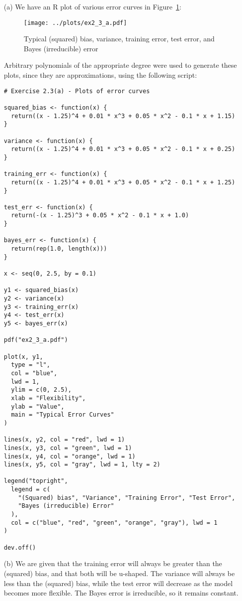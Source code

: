 
\begin{itemize}
    \item[(a)] We have an R plot of various error curves in Figure~\ref{fig2_3err}:
    \begin{figure}[!ht]
        \texttt{[image: ../plots/ex2\_3\_a.pdf]}
        \caption{
            Typical (squared) bias, variance, training error, test error, and Bayes 
            (irreducible) error \label{fig2_3err}
        }
    \end{figure}
    Arbitrary polynomials of the appropriate degree were used to generate these 
    plots, since they are approximations, using the following script:
    \scriptsize\begin{verbatim}
# Exercise 2.3(a) - Plots of error curves

squared_bias <- function(x) {
  return((x - 1.25)^4 + 0.01 * x^3 + 0.05 * x^2 - 0.1 * x + 1.15)
}

variance <- function(x) {
  return((x - 1.25)^4 + 0.01 * x^3 + 0.05 * x^2 - 0.1 * x + 0.25)
}

training_err <- function(x) {
  return((x - 1.25)^4 + 0.01 * x^3 + 0.05 * x^2 - 0.1 * x + 1.25)
}

test_err <- function(x) {
  return(-(x - 1.25)^3 + 0.05 * x^2 - 0.1 * x + 1.0)
}

bayes_err <- function(x) {
  return(rep(1.0, length(x)))
}

x <- seq(0, 2.5, by = 0.1)

y1 <- squared_bias(x)
y2 <- variance(x)
y3 <- training_err(x)
y4 <- test_err(x)
y5 <- bayes_err(x)

pdf("ex2_3_a.pdf")

plot(x, y1,
  type = "l", 
  col = "blue", 
  lwd = 1, 
  ylim = c(0, 2.5), 
  xlab = "Flexibility",
  ylab = "Value", 
  main = "Typical Error Curves"
)

lines(x, y2, col = "red", lwd = 1)
lines(x, y3, col = "green", lwd = 1)
lines(x, y4, col = "orange", lwd = 1)
lines(x, y5, col = "gray", lwd = 1, lty = 2)

legend("topright",
  legend = c(
    "(Squared) bias", "Variance", "Training Error", "Test Error",
    "Bayes (irreducible) Error"
  ),
  col = c("blue", "red", "green", "orange", "gray"), lwd = 1
)

dev.off()

    \end{verbatim}\normalsize
  \item[(b)] We are given that the training error will always be greater than
  the (squared) bias, and that both will be u-shaped. The variance will always
  be less than the (squared) bias, while the test error will decrease as the model
  becomes more flexible. The Bayes error is irreducible, so it remains constant.
\end{itemize}
